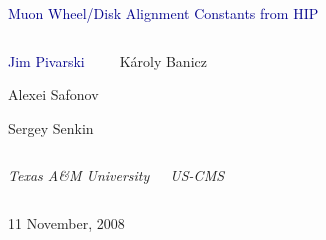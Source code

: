 \documentclass[compress]{beamer}
\begin{document}
\begin{frame}
\vfill
\begin{center}
\textcolor{darkblue}{\Large Muon Wheel/Disk Alignment Constants from HIP}

\vfill
\begin{columns}
\begin{center}
\large
\textcolor{darkblue}{Jim Pivarski}

\vspace{0.2 cm}
Alexei Safonov

\vspace{0.2 cm}
Sergey Senkin
\end{center}

\begin{center}
\large
K\'aroly Banicz
\end{center}
\end{columns}

\begin{columns}
\begin{center}
\scriptsize
{\it Texas A\&M University}
\end{center}
\begin{center}
\scriptsize
{\it US-CMS}
\end{center}
\end{columns}

\vfill
11 November, 2008

\end{center}
\end{frame}


\small
\end{document}
